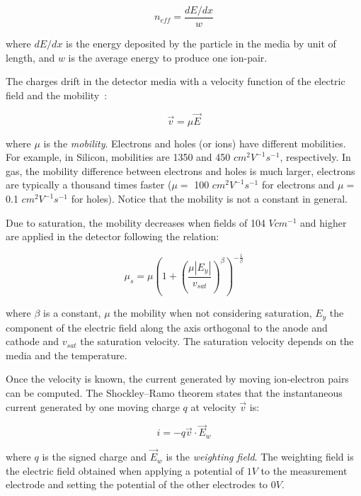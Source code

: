 \documentclass[11pt]{article}
\begin{document}
	\[n_{eff} = \frac{dE/dx}{w} \]

	where $dE/dx$ is the energy deposited by the particle in the media by
	unit of length, and $w$ is the average energy to produce one ion-pair.

	The charges drift in the detector media with a velocity function of the electric
	field and the mobility~\cite{spieler2005semiconductor}:

\begin{equation}
	\vec{v} = \mu \vec{E}
\label{eq:charge_speed}
\end{equation}

	where $\mu$ is the \textit{mobility}. Electrons and holes (or ions) have different
	mobilities. For example, in Silicon, mobilities are 1350 and 450 $cm^2V^{-1}s^{-1}$,
	respectively. In gas, the mobility difference between electrons and holes is
	much larger, electrons are typically a thousand times faster ($\mu =$ 100 $cm^2V^{-1}s^{-1}$
	for electrons and $\mu =$ 0.1 $cm^2V^{-1}s^{-1}$ for holes). Notice that the mobility
	is not a constant in general.

	Due to saturation, the mobility decreases when fields of 104 $V cm^{-1}$ and higher are applied in
	the detector following the relation:

\begin{equation}
	\mu_s = \mu \left (1 + \left (\frac{\mu |E_y|}{v_{sat}} \right )^{\beta} \right )^{-\frac{1}{\beta}}
	\label{eq:saturation}
\end{equation}

	where $\beta$ is a constant, $\mu$ the mobility when not considering saturation,
	$E_y$ the component of the electric field along the axis orthogonal to the anode and cathode
	and $v_{sat}$ the saturation velocity. The saturation velocity depends on the
	media and the temperature.

	Once the velocity is known, the current generated by moving ion-electron
	pairs can be computed. The Shockley–Ramo theorem states that the instantaneous current generated
	by one moving charge $q$ at velocity $\vec{v}$ is:

\begin{equation}
	i = -q \vec{v} \cdot \vec{E}_w
	\label{eq:ramo}
\end{equation}

	where $q$ is the signed charge and $\vec{E}_w$ is the \textit{weighting field}. The weighting field is the electric field
	obtained when applying a potential of $1V$ to the measurement electrode and setting
	the potential of the other electrodes to $0V$.
\end{document}
